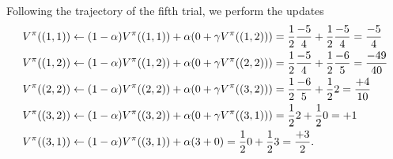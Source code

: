 \documentclass[11pt, a4paper]{article}
\begin{document}
\begin{enumerate}
\begin{solution}
        Following the trajectory of the fifth trial, we perform the updates
        \begin{align*}
            V^\pi((1, 1)) & \gets (1 - \alpha) V^\pi((1, 1)) + \alpha \rbk*{0 + \gamma V^\pi((1, 2))} = \frac{1}{2} \frac{-5}{4} + \frac{1}{2} \frac{-5}{4} = \frac{-5}{4} \\
            V^\pi((1, 2)) & \gets (1 - \alpha) V^\pi((1, 2)) + \alpha \rbk*{0 + \gamma V^\pi((2, 2))} = \frac{1}{2} \frac{-5}{4} + \frac{1}{2} \frac{-6}{5} = \frac{-49}{40} \\
            V^\pi((2, 2)) & \gets (1 - \alpha) V^\pi((2, 2)) + \alpha \rbk*{0 + \gamma V^\pi((3, 2))} = \frac{1}{2} \frac{-6}{5} + \frac{1}{2} 2 = \frac{+4}{10} \\
            V^\pi((3, 2)) & \gets (1 - \alpha) V^\pi((3, 2)) + \alpha \rbk*{0 + \gamma V^\pi((3, 1))} = \frac{1}{2} 2 + \frac{1}{2} 0 = +1 \\
            V^\pi((3, 1)) & \gets (1 - \alpha) V^\pi((3, 1)) + \alpha \rbk*{3 + 0} = \frac{1}{2} 0 + \frac{1}{2} 3 = \frac{+3}{2} .
        \end{align*}

        \begin{figure}[h]
            \centering
        \end{figure}
    \end{solution}
\end{enumerate}
\end{document}
